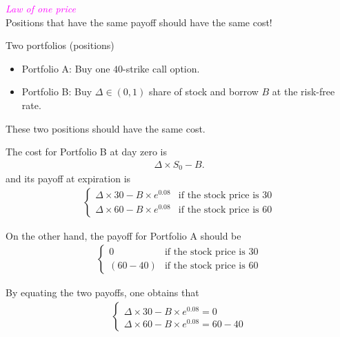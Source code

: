 \begin{frame}[fragile,t]
\begin{center}
	\textcolor{magenta}{\it Law of one price}\\

	\bigskip
	Positions that have the same payoff should have the same cost!
	\bigskip
	\mySeparateLine
	\bigskip

	Two portfolios (positions)
	\bigskip

	\begin{itemize}
		\item Portfolio A: Buy one $40$-strike call option.
		\item Portfolio B: Buy $\Delta\in (0,1)$ share of stock and borrow $B$ at the risk-free rate.
	\end{itemize}
	\bigskip

	These two positions should have the same cost.
\end{center}
\end{frame}
\begin{frame}[fragile,t]
\begin{mysol}
	The cost for Portfolio B at day zero is
	\begin{align*}
		\Delta \times S_0 - B.
	\end{align*}
	and its payoff at expiration is
	\begin{align*}
		\begin{cases}
			\Delta \times 30 - B\times e^{0.08} & \text{if the stock price is $30$} \\
			\Delta \times 60 - B\times e^{0.08} & \text{if the stock price is $60$}
		\end{cases}
	\end{align*}
	\bigskip

	On the other hand, the payoff for Portfolio A should be
	\begin{align*}
		\begin{cases}
			0       & \text{if the stock price is $30$} \\
			(60-40) & \text{if the stock price is $60$}
		\end{cases}
	\end{align*}

	\vfill
	By equating the two payoffs, one obtains that
	\begin{align*}
		\begin{cases}
			\Delta \times 30 - B\times e^{0.08} = 0 \\
			\Delta \times 60 - B\times e^{0.08} = 60-40
		\end{cases}
	\end{align*}
\end{mysol}
\end{frame}
